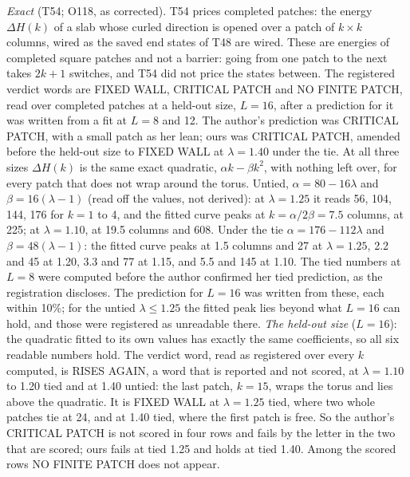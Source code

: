 \documentclass[aps,pre,10pt,twocolumn,superscriptaddress,nofootinbib]{revtex4-2}
\begin{document}
\emph{Exact} (T54; O118, as corrected). T54 prices completed patches: the energy $\Delta H(k)$ of a slab whose
curled direction is opened over a patch of $k \times k$ columns, wired as the saved end states of T48 are wired.
These are energies of completed square patches and not a barrier: going from one patch to the next takes $2k + 1$
switches, and T54 did not price the states between. The registered verdict words are FIXED WALL, CRITICAL PATCH and
NO FINITE PATCH, read over completed patches at a held-out size, $L = 16$, after a prediction for it was written
from a fit at $L = 8$ and 12. The author's prediction was CRITICAL PATCH, with a small patch as her lean; ours was
CRITICAL PATCH, amended before the held-out size to FIXED WALL at $\lambda = 1.40$ under the tie. At all three sizes
$\Delta H(k)$ is the same exact quadratic, $\alpha k - \beta k^2$, with nothing left over, for every patch that does
not wrap around the torus. Untied, $\alpha = 80 - 16\lambda$ and $\beta = 16(\lambda - 1)$ (read off the values, not
derived): at $\lambda = 1.25$ it reads 56, 104, 144, 176 for $k = 1$ to 4, and the fitted curve peaks at
$k = \alpha/2\beta = 7.5$ columns, at 225; at $\lambda = 1.10$, at 19.5 columns and 608. Under the tie
$\alpha = 176 - 112\lambda$ and $\beta = 48(\lambda - 1)$: the fitted
curve peaks at 1.5 columns and 27 at $\lambda = 1.25$, 2.2 and 45 at 1.20, 3.3 and 77 at 1.15, and 5.5 and 145 at
1.10. The tied numbers at $L = 8$ were computed before the author confirmed her tied prediction, as the registration
discloses. The prediction for $L = 16$ was written from these, each within 10\%; for the untied $\lambda \le 1.25$
the fitted peak lies beyond what $L = 16$ can hold, and those were registered as unreadable there. \emph{The
held-out size} ($L = 16$): the quadratic fitted to its own values has exactly the same coefficients, so all six
readable numbers hold. The verdict word, read as registered over every $k$ computed, is RISES AGAIN, a word that is
reported and not scored, at $\lambda = 1.10$ to 1.20 tied and at 1.40 untied: the last patch, $k = 15$, wraps the
torus and lies above the quadratic. It is FIXED WALL at $\lambda = 1.25$ tied, where two whole patches tie at 24,
and at 1.40 tied, where the first patch is free. So the author's CRITICAL PATCH is not scored in four rows and fails
by the letter in the two that are scored; ours fails at tied 1.25 and holds at tied 1.40. Among the scored rows NO
FINITE PATCH does not appear.
\end{document}
